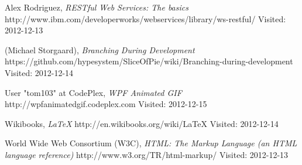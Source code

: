 \begin{thebibliography}{99}
		Alex Rodriguez,
		\emph{RESTful Web Services: The basics}\newline
		http://www.ibm.com/developerworks/webservices/library/ws-restful/\newline
		Visited: 2012-12-13
		
		\SOP{} (Michael Storgaard),
		\emph{Branching During Development}\newline
		https://github.com/hypesystem/SliceOfPie/wiki/Branching-during-development\newline
		Visited: 2012-12-14

		User "tom103" at CodePlex,
		\emph{WPF Animated GIF}\newline
		http://wpfanimatedgif.codeplex.com\newline
		Visited: 2012-12-15
		
		Wikibooks,
		\emph{\LaTeX}\newline
		http://en.wikibooks.org/wiki/LaTeX\newline
		Visited: 2012-12-14

		World Wide Web Consortium (W3C),
		\emph{HTML: The Markup Language (an HTML language reference)}\newline
		http://www.w3.org/TR/html-markup/\newline
		Visited: 2012-12-13
\end{thebibliography}
